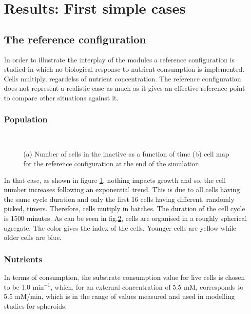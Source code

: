 \documentclass[11pt,a4paper]{article}
\begin{document}
\newpage
\section{Results: First simple cases}
\subsection{The reference configuration}
In order to illustrate the interplay of the modules a reference configuration is studied in which no biological response to nutrient consumption is implemented. Cells multiply, regardelss of nutrient concentration. The reference configuration does not represent a realistic case as much as it gives an effective reference point to compare other situations against it.\\

\subsubsection{Population}
\begin{figure}[ht!]
\begin{subfigure}{0.5\textwidth}
	\centering
	
	\caption{ \label{ref_numbers}}
\end{subfigure}
~~
\begin{subfigure}{0.5\textwidth}
	\centering
	
	\caption{\label{ref_Grid}}
\end{subfigure}
\caption{(a) Number of cells in the inactive as a function of time (b) cell map for the reference configuration at the end of the simulation \label{ref_population}}
\end{figure}

In that case, as shown in figure \ref{ref_numbers}, nothing impacts growth and so, the cell number increases following an exponential trend. This is due to all cells having the same cycle duration and only the first 16 cells having different, randomly picked, timers. Therefore, cells mutiply in batches. The duration of the cell cycle is 1500 minutes. As can be seen in fig.\ref{ref_Grid}, cells are organised in a roughly spherical agregate. The color gives the index of the cells. Younger cells are yellow while older cells are blue. \\ 

\subsubsection{Nutrients}
In terms of consumption, the substrate consumption value for live cells is chosen to be 1.0 min$^{-1}$, which, for an external concentration of 5.5 mM, corresponds to 5.5 mM/min, which is in the range of values measured and used in modelling studies for spheroids.\cite{Kempf2005}\cite{Mao2018} \\
\end{document}
